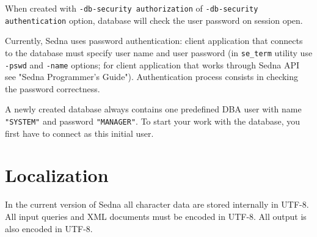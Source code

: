 \documentclass[a4paper,12pt]{article}
\begin{document}
When created with \verb!-db-security authorization! of \verb!-db-security authentication! option, database will check the user password on session open.

Currently, Sedna uses password authentication: client application that connects to the database must specify user name and user password (in \verb!se_term! utility use \verb!-pswd! and \verb!-name! options; for client application that works through Sedna API see "Sedna Programmer's Guide"). Authentication process consists in checking the password correctness.

A newly created database always contains one predefined DBA user with name \verb!"SYSTEM"! and password \verb!"MANAGER"!. To start your work with the database, you first have to connect as this initial user.

\section{Localization}
In the current version of Sedna all character data are stored internally in UTF-8.
All input queries and XML documents must be encoded in UTF-8.
All output is also encoded in UTF-8.
\end{document}
